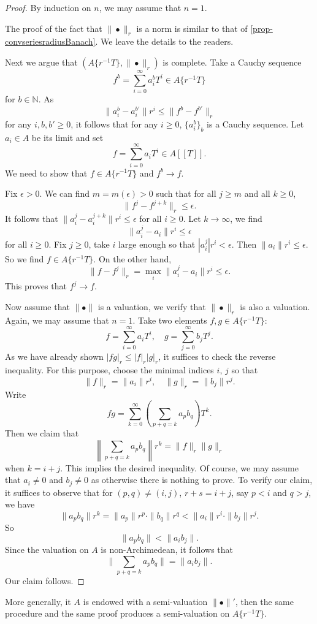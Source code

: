\begin{proof}
    By induction on $n$, we may assume that $n=1$.

    The proof of the fact that $\|\bullet\|_r$ is a norm is similar to that of \cref{prop-convseriesradiusBanach}. We leave the details to the readers.

    Next we argue that $(A\{ r^{-1}T \}  ,\|\bullet\|_r)$  is complete. 
    Take a Cauchy sequence 
    \[
        f^b=\sum_{i=0}^{\infty}a^b_i T^i\in A\{ r^{-1}T \}
    \]
    for $b\in \mathbb{N}$. As 
    \[
        \|a^b_i-a^{b'}_i\|r^i\leq \|f^b-f^{b'}\|_r
    \]
    for any $i,b,b'\geq 0$, it follows that for any $i\geq 0$, $\{a^b_i\}_b$ is a Cauchy sequence. Let $a_i\in A$ be its limit and set 
    \[
        f=\sum_{i=0}^{\infty}a_i T^i\in A[[T]].
    \]
    We need to show that $f\in A\{ r^{-1}T \}$ and $f^b\to f$.
    
    Fix $\epsilon>0$. We can find $m=m(\epsilon)>0$ such that for all $j\geq m$ and all $k\geq 0$, 
    \[
      \|f^j-f^{j+k}\|_r\leq \epsilon.  
    \]
    It follows that $\|a^j_i-a^{j+k}_i\|r^i\leq \epsilon$ for all $i\geq 0$. Let $k\to\infty$, we find
    \[
        \|a^j_i-a_i\|r^i\leq \epsilon
    \]
    for all $i\geq 0$. Fix $j\geq 0$, take $i$ large enough so that $|a^j_i|r^i<\epsilon$. Then $\|a_i\|r^i\leq \epsilon$. So we find $f\in A\{r^{-1}T\}$. On the other hand,
    \[
         \|f-f^j\|_r=\max_{i} \|a^j_i-a_i\|r^i\leq \epsilon.  
    \]
    This proves that $f^j\to f$.

    Now assume that $\|\bullet\|$ is a valuation, we verify that $\|\bullet\|_r$ is also a valuation. Again, we may assume that $n=1$. Take two elements $f,g\in A\{r^{-1}T\}$:
    \[
        f=\sum_{i=0}^{\infty}a_i T^i,\quad g=\sum_{j=0}^{\infty}b_j T^j.
    \]
    As we have already shown $|fg|_r\leq |f|_r|g|_r$, it suffices to check the reverse inequality. For this purpose, choose the minimal indices $i$, $j$ so that
    \[
        \|f\|_r=\|a_i\|r^i,\quad \|g\|_r=\|b_j\|r^j.  
    \]
    Write
    \[
        fg=\sum_{k=0}^{\infty} \left(\sum_{p+q=k}a_pb_q  \right)T^k.
    \]
    Then we claim that
    \[
        \left\|\sum_{p+q=k}a_pb_q\right\| r^k =  \|f\|_r \|g\|_r
    \] 
    when $k=i+j$.
    This implies the desired inequality.  Of course, we may assume that $a_i\neq 0$ and $b_j\neq 0$ as otherwise there is nothing to prove.
    To verify our claim, it suffices to observe that for $(p,q)\neq (i,j)$, $r+s=i+j$, say $p<i$ and $q>j$, we have
    \[
        \|a_p b_q\|r^k=\|a_p\|r^p\cdot \|b_q\|r^q<\|a_i\|r^i\cdot \|b_j\|r^j.
    \]
    So 
    \[
        \|a_p b_q\|< \|a_i b_j\|.
    \]
    Since the valuation on $A$ is non-Archimedean, it follows that 
    \[
        \|\sum_{p+q=k}a_pb_q\|=\|a_ib_j\|.  
    \]
    Our claim follows.
\end{proof}
\begin{remark}\label{rmk-semivaluationinducetate}
    More generally, it $A$ is endowed with a semi-valuation $\|\bullet\|'$, then the same procedure and the same proof produces a semi-valuation on $A\{ r^{-1}T \}$.
\end{remark}


